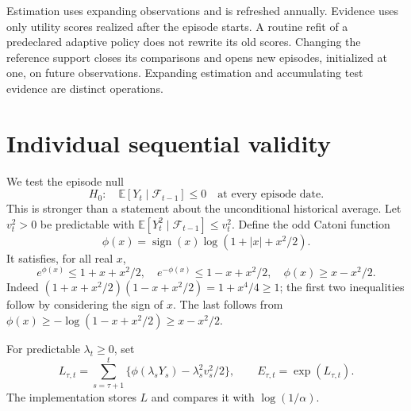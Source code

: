 \documentclass[11pt,a4paper]{article}
\theoremstyle{remark}\newtheorem{remark}[theorem]{Remark}
\newcommand{\E}{\mathbb E}\newcommand{\Prb}{\mathbb P}
\newcommand{\F}{\mathcal F}\newcommand{\G}{\mathcal G}\newcommand{\W}{\mathcal W}
\begin{document}
Estimation uses expanding observations and is refreshed annually. Evidence
uses only utility scores realized after the episode starts. A routine refit of
a predeclared adaptive policy does not rewrite its old scores. Changing the
reference support closes its comparisons and opens new episodes, initialized
at one, on future observations. Expanding estimation and accumulating test
evidence are distinct operations.

\section{Individual sequential validity}
We test the episode null
\begin{equation}
 H_0:\quad\E[Y_t\mid\F_{t-1}]\le0\quad\text{at every episode date}.\label{eq:null}
\end{equation}
This is stronger than a statement about the unconditional historical average.
Let $v_t^2>0$ be predictable with
$\E[Y_t^2\mid\F_{t-1}]\le v_t^2$. Define the odd Catoni function
\begin{equation}
 \phi(x)=\operatorname{sign}(x)\log(1+|x|+x^2/2).
\end{equation}
It satisfies, for all real $x$,
\begin{equation}
 e^{\phi(x)}\le1+x+x^2/2,\quad
 e^{-\phi(x)}\le1-x+x^2/2,\quad
 \phi(x)\ge x-x^2/2.\label{eq:phi}
\end{equation}
Indeed $(1+x+x^2/2)(1-x+x^2/2)=1+x^4/4\ge1$; the first two inequalities
follow by considering the sign of $x$. The last follows from
$\phi(x)\ge-\log(1-x+x^2/2)\ge x-x^2/2$.

For predictable $\lambda_t\ge0$, set
\begin{equation}
 L_{\tau,t}=\sum_{s=\tau+1}^t\{\phi(\lambda_sY_s)-\lambda_s^2v_s^2/2\},
 \qquad E_{\tau,t}=\exp(L_{\tau,t}).\label{eq:eprocess}
\end{equation}
The implementation stores $L$ and compares it with $\log(1/\alpha)$.
\end{document}
